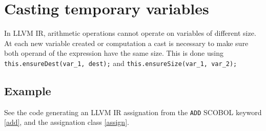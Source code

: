 \section{Casting temporary variables}

In LLVM IR, arithmetic operations cannot operate on variables of different size. At each new variable created or computation a cast is necessary to make sure both operand of the expression have the same size. This is done using \verb!this.ensureDest(var_1, dest);! and \verb!this.ensureSize(var_1, var_2);!

\subsection{Example}
See the code generating an LLVM IR assignation from the \verb!ADD! SCOBOL keyword \ref{add}, and the assignation class \ref{assign}.



